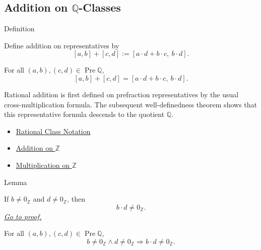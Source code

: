 \subsection*{\texorpdfstring{Addition on $\mathbb{Q}$-Classes}{Addition on Q-Classes}}

\begin{definitionbox}{Definition}
\begin{definition}
\label{def:addition-on-q-classes}
Define addition on representatives by
\[
[a,b]+[c,d]:=[a\cdot d+b\cdot c,\ b\cdot d].
\]
\end{definition}
\end{definitionbox}

\begin{remark*}
For all $(a,b),(c,d)\in\operatorname{Pre}\mathbb{Q}$,
\[
[a,b]+[c,d]=[a\cdot d+b\cdot c,\ b\cdot d].
\]
\end{remark*}

\begin{remark*}[Interpretation]
Rational addition is first defined on prefraction representatives by the
usual cross-multiplication formula. The subsequent well-definedness theorem
shows that this representative formula descends to the quotient
$\mathbb{Q}$.
\end{remark*}

\begin{dependencies}
\begin{itemize}
  \item \hyperref[def:rational-class-notation]{Rational Class Notation}
  \item \hyperref[def:addition-on-z-classes]{Addition on $\mathbb{Z}$}
  \item \hyperref[def:multiplication-on-z-classes]{Multiplication on $\mathbb{Z}$}
\end{itemize}
\end{dependencies}

\begin{lemmabox}{Lemma}
\begin{lemma}
\label{lem:addition-denominator-nonzero-q}
If $b\ne 0_{\mathbb{Z}}$ and $d\ne 0_{\mathbb{Z}}$, then
\[
b\cdot d\ne 0_{\mathbb{Z}}.
\]
\hyperref[prf:addition-denominator-nonzero-q]{\textit{Go to proof.}}
\end{lemma}
\end{lemmabox}

\begin{remark*}
For all $(a,b),(c,d)\in\operatorname{Pre}\mathbb{Q}$,
\[
b\ne 0_{\mathbb{Z}}\land d\ne 0_{\mathbb{Z}}
\Longrightarrow b\cdot d\ne 0_{\mathbb{Z}}.
\]
\end{remark*}

